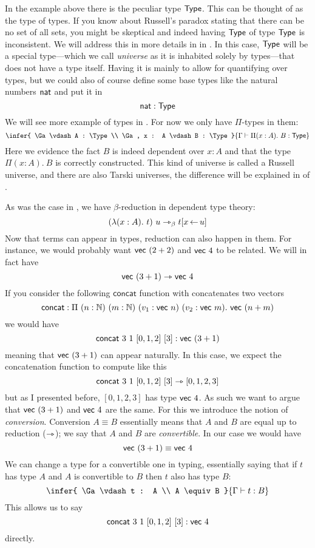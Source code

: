 
In the example above there is the peculiar type \(\mathsf{Type}\).
This can be thought of as the type of types. If you know about Russell's paradox
stating that there can be no set of all sets, you might be skeptical and indeed
having \(\mathsf{Type}\) of type \(\mathsf{Type}\) is inconsistent.
We will address this in more details in  in
.
In this case, \(\mathsf{Type}\) will be a special type---which we call \emph{universe}
as it is inhabited solely by types---that does not have a type itself.
Having it is mainly to allow for quantifying over types, but we could also of
course define some base types like the natural numbers \(\mathsf{nat}\) and put it in
\[
  \mathsf{nat} : \mathsf{Type}
\]
We will see more example of types in . For now we only have
\(\Pi\)-types in them:
\[
  \infer
    {
      \Ga \vdash A : \Type \\
      \Ga, x : A \vdash B : \Type
    }
    {\Ga \vdash \Pi (x:A).\ B : \Type}
\]
Here we evidence the fact \(B\) is indeed dependent over \(x : A\)
and that the type \(\Pi (x:A).\ B\) is correctly constructed.
This kind of universe is called a Russell universe, and there are also Tarski
universes, the difference will be explained in 
of .

As was the case in , we have \(\beta\)-reduction in
dependent type theory:
\[
  (\lambda (x:A).\ t)\ u \rightarrowtriangle_\beta t[x \mathop{\leftarrow} u]
\]
Now that terms can appear in types, reduction can also happen in them.
For instance, we would probably want \(\mathsf{vec}\ (2 + 2)\) and \(\mathsf{vec}\ 4\) to be
related. We will in fact have
\[
  \mathsf{vec}\ (3 + 1) \rightarrowtriangle \mathsf{vec}\ 4
\]
If you consider the following \(\mathsf{concat}\) function with concatenates
two vectors
\[
  \mathsf{concat} :
  \Pi\ (n : \mathbb{N})\ (m : \mathbb{N})\ (v_1 : \mathsf{vec}\ n)\ (v_2 : \mathsf{vec}\ m).\
  \mathsf{vec}\ (n + m)
\]
we would have
\[
  \mathsf{concat}\ 3\ 1\ [0,1,2]\ [3] : \mathsf{vec}\ (3 + 1)
\]
meaning that \(\mathsf{vec}\ (3 + 1)\) can appear naturally.
In this case, we expect the concatenation function to compute like this
\[
  \mathsf{concat}\ 3\ 1\ [0,1,2]\ [3] \rightarrowtriangle [0,1,2,3]
\]
but as I presented before, \([0,1,2,3]\) has type \(\mathsf{vec}\ 4\).
As such we want to argue that \(\mathsf{vec}\ (3 + 1)\) and \(\mathsf{vec}\ 4\) are the same.
For this we introduce the notion of \emph{conversion}.
Conversion \(A \equiv B\) essentially means that \(A\) and \(B\) are equal up
to reduction (\(\rightarrowtriangle\)); we say that \(A\) and \(B\) are \emph{convertible}.
In our case we would have
\[
  \mathsf{vec}\ (3 + 1) \equiv \mathsf{vec}\ 4
\]
We can change a type for a convertible one in typing, essentially saying that if
\(t\) has type \(A\) and \(A\) is convertible to \(B\) then \(t\) also has type
\(B\):
\[
  \infer
    {
      \Ga \vdash t : A \\
      A \equiv B
    }
    {\Ga \vdash t : B}
\]
This allows us to say
\[
  \mathsf{concat}\ 3\ 1\ [0,1,2]\ [3] : \mathsf{vec}\ 4
\]
directly.

